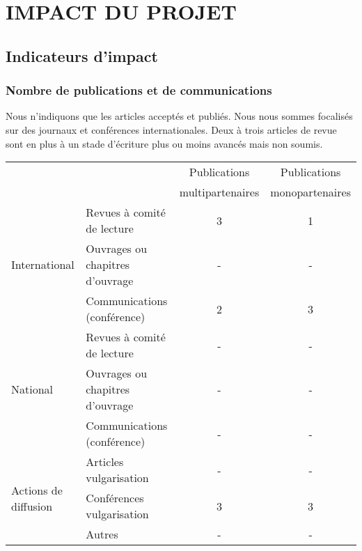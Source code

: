 \section{IMPACT DU PROJET}
\label{sec:impact}

\subsection{Indicateurs d’impact}
\subsubsection*{Nombre de publications et de communications}
Nous n'indiquons que les articles acceptés et publiés. Nous nous sommes focalisés sur des journaux et conférences internationales. Deux à trois articles de revue sont en plus à un stade d'écriture plus ou moins avancés mais non soumis.

\begin{table}[htbp]
\small
    \centering
    \begin{tabular}{|p{3.25cm}|p{3.25cm}|c|c|}
    \hline
&  & Publications & Publications\\
 & &multipartenaires & monopartenaires \\
\hline

\multirow{3}{*}{International}&Revues à comité de lecture& 3&1\\\cline{2-4}
&Ouvrages ou chapitres d’ouvrage& -&-\\\cline{2-4}
&Communications (conférence)&2&3\\\hline
\multirow{3}{*}{National}&Revues à comité de lecture&-&-\\\cline{2-4}
&Ouvrages ou chapitres d’ouvrage&-&-\\\cline{2-4}
&Communications (conférence)&-&-\\\hline
\multirow{3}{*}{Actions de diffusion}&Articles vulgarisation&-&-\\\cline{2-4}
&Conférences vulgarisation&3&3\\\cline{2-4}
&Autres&-&-\\
\hline
    \end{tabular}
    \label{tab:publis}
\end{table}


